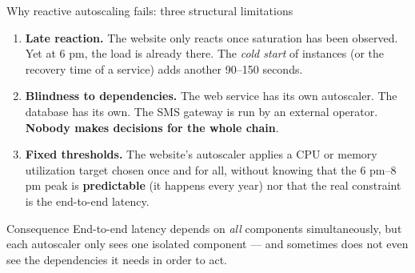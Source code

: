 \documentclass[10pt]{beamer}
\begin{document}
\begin{frame}{Why reactive autoscaling fails: three structural limitations}
  \begin{enumerate}
    \item \textbf{Late reaction.} The website only reacts once saturation has been observed. Yet at 6 pm, the load is already there. The \emph{cold start} of instances (or the recovery time of a service) adds another 90--150 seconds.
    \item \textbf{Blindness to dependencies.} The web service has its own autoscaler. The database has its own. The SMS gateway is run by an external operator. \textbf{Nobody makes decisions for the whole chain}.
    \item \textbf{Fixed thresholds.} The website's autoscaler applies a CPU or memory utilization target chosen once and for all, without knowing that the 6 pm--8 pm peak is \textbf{predictable} (it happens every year) nor that the real constraint is the end-to-end latency.
  \end{enumerate}

  \vspace{0.3cm}
  \begin{alertblock}{Consequence}
    End-to-end latency depends on \emph{all} components simultaneously, but each autoscaler only sees one isolated component --- and sometimes does not even see the dependencies it needs in order to act.
  \end{alertblock}
\end{frame}
\end{document}
